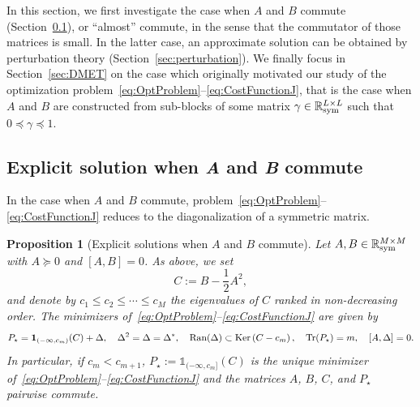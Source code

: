 \documentclass{article}
\def\R{\mathbb R}
\newtheorem{proposition}[theorem]{Proposition}
\newcommand{\tr}{{\rm Tr}}
\newcommand{\1}{{\mathds 1}}
\begin{document}
In this section, we first investigate the case when $A$ and $B$ commute (Section~\ref{sec:ABcommute}), or ``almost'' commute, in the sense that the commutator of those matrices is small. In the latter case, an approximate solution can be obtained by perturbation theory (Section~\ref{sec:perturbation}). We finally focus in Section~\ref{sec:DMET} on the case which originally motivated our study of the optimization problem~\eqref{eq:OptProblem}--\eqref{eq:CostFunctionJ}, that is the case when $A$ and $B$ are constructed from sub-blocks of some matrix $\gamma \in \R^{L \times L}_{\rm sym}$ such that $0 \preceq \gamma \preceq 1$.

\subsection{Explicit solution when {\it A} and {\it B} commute}
\label{sec:ABcommute}

In the case when $A$ and $B$ commute, problem~\eqref{eq:OptProblem}--\eqref{eq:CostFunctionJ} reduces to the diagonalization of a symmetric matrix.

\begin{proposition}[Explicit solutions when $A$ and $B$ commute]
\label{prop:AB_commute}
Let $A ,B \in \R^{M \times M}_{\rm sym}$ with $A \succeq 0$ and $[A,B]=0$.  As above, we set 
$$
C := B - \frac 12 A^2,
$$
and denote by $c_1 \le c_2 \le \cdots \le c_M$ the eigenvalues of $C$ ranked in non-decreasing order. The minimizers of~\eqref{eq:OptProblem}--\eqref{eq:CostFunctionJ} are given by
\begin{equation}\label{eq:Pstar_commuting_case}
      P_\star = \mathbf{1}_{(-\infty,c_m)}\!\left( C\right) +\Delta, \quad \Delta^2 = \Delta=\Delta^*, \quad \mathrm{Ran}(\Delta) \subset \mathrm{Ker}\left( C-c_m\right), \quad \tr(P_\star)=m, \quad [A,\Delta]=0.
\end{equation}
In particular, if $c_m < c_{m+1}$, $P_\star:=\1_{(-\infty,c_m]}(C)$ is the unique minimizer of~\eqref{eq:OptProblem}--\eqref{eq:CostFunctionJ} and the matrices $A$, $B$, $C$, and $P_\star$ pairwise commute.
\end{proposition}
\end{document}
